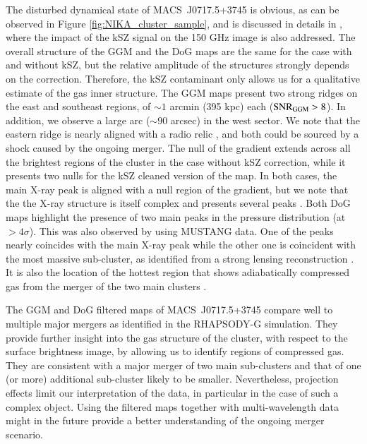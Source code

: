 \documentclass[twocolumn,traditabstract]{aa}
\begin{document}
The disturbed dynamical state of \mbox{MACS~J0717.5+3745} is obvious, as can be observed in Figure \ref{fig:NIKA_cluster_sample}, and is discussed in details in \cite{Adam2016b}, where the impact of the kSZ signal on the 150 GHz image is also addressed. The overall structure of the GGM and the DoG maps are the same for the case with and without kSZ, but the relative amplitude of the structures strongly depends on the correction. Therefore, the kSZ contaminant only allows us for a qualitative estimate of the gas inner structure. The GGM maps present two strong ridges on the east and southeast regions, of $\sim 1$ arcmin (395 kpc) each (${\rm SNR}_{\rm GGM} > 8$). In addition, we observe a large arc ($\sim 90$ arcsec) in the west sector. We note that the eastern ridge is nearly aligned with a radio relic \citep[see, e.g.,][]{vanWeeren2017}, and both could be sourced by a shock caused by the ongoing merger. The null of the gradient extends across all the brightest regions of the cluster in the case without kSZ correction, while it presents two nulls for the kSZ cleaned version of the map. In both cases, the main X-ray peak is aligned with a null region of the gradient, but we note that the the X-ray structure is itself complex and presents several peaks \citep[e.g.,][]{Ma2009}. Both DoG maps highlight the presence of two main peaks in the pressure distribution (at $> 4 \sigma$). This was also observed by \cite{Mroczkowski2012} using MUSTANG data. One of the peaks nearly coincides with the main X-ray peak while the other one is coincident with the most massive sub-cluster, as identified from a strong lensing reconstruction \citep[e.g.,][]{Limousin2015}. It is also the location of the hottest region that shows adiabatically compressed gas from the merger of the two main clusters \citep[see][]{Adam2016b}.

The GGM and DoG filtered maps of \mbox{MACS~J0717.5+3745} compare well to multiple major mergers as identified in the RHAPSODY-G simulation. They provide further insight into the gas structure of the cluster, with respect to the surface brightness image, by allowing us to identify regions of compressed gas. They are consistent with a major merger of two main sub-clusters and that of one (or more) additional sub-cluster likely to be smaller. Nevertheless, projection effects limit our interpretation of the data, in particular in the case of such a complex object. Using the filtered maps together with multi-wavelength data might in the future provide a better understanding of the ongoing merger scenario.
\end{document}
